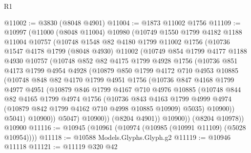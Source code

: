 \begin{lexlean}{R1}
\begin{coremodule}
@11002 := @3830 (@8048 @4901)
@11004 := @1873 @11002 @1756
@11109 := @10997
    (@11000
      (@8048 @11004)
      @10980
      (@10749
        @1550
        @1799
        @4182
        @1188
        @11004
        @10757
        (@10748
          @1548
          @82
          @4180
          @1799
          @11002
          @1756
          (@10736
            @1547
            @4178
            @1799
            (@8048 @4930)
            @11002
            (@10749
              @854
              @1799
              @4177
              @1188
              @4930
              @10757
              (@10748
                @852
                @82
                @4175
                @1799
                @4928
                @1756
                (@10736
                  @851
                  @4173
                  @1799
                  @4954
                  @4928
                  (@10879
                    @850
                    @1799
                    @4172
                    @710
                    @4953
                    @10885
                    (@10748
                      @848
                      @82
                      @4170
                      @1799
                      @4951
                      @1756
                      (@10736
                        @847
                        @4168
                        @1799
                        @4977
                        @4951
                        (@10879
                          @846
                          @1799
                          @4167
                          @710
                          @4976
                          @10885
                          (@10748
                            @844
                            @82
                            @4165
                            @1799
                            @4974
                            @1756
                            (@10736
                              @843
                              @4163
                              @1799
                              @4999
                              @4974
                              (@10879 @842 @1799 @4162 @710 @4998 @10885 @10909)
                              @5035)
                            @10900))
                        @5041)
                      @10900))
                  @5047)
                @10900))
            (@8204 @4901))
          @10900))
      (@8204 @10978))
    @10900
@11116 := @10945 (@10961 (@10974 (@10985 (@10991 @11109) (@5028 @10954))))
@11118 := @10588 Models.Glyphs.Glyph.g2
@11119 := @10946 @11118
@11121 := @11119 @320 @42

\end{coremodule}
\end{lexlean}
